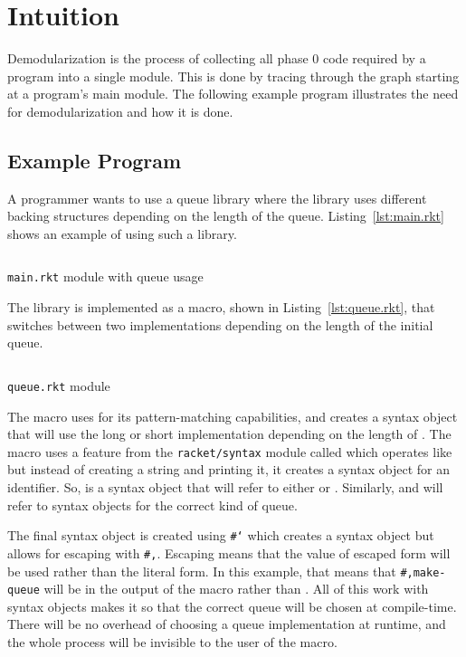 \chapter{Intuition}
\label{chap:intuition}
Demodularization is the process of collecting all phase 0 code required by a program into a single module.
This is done by tracing through the  graph starting at a program's main module.
The following example program illustrates the need for demodularization and how it is done.

\section{Example Program}
A programmer wants to use a queue library where the library uses different backing structures depending on the length of the queue. 
Listing~\ref{lst:main.rkt} shows an example of using such a library.
\begin{listing}[tb]
  \inputminted{racket}{listings/main.rkt}
  \caption{\texttt{main.rkt} module with queue usage}
  \label{lst:main.rkt}
\end{listing}
The library is implemented as a macro, shown in Listing~\ref{lst:queue.rkt}, that switches between two implementations depending on the length of the initial queue.

\begin{listing}[tb]
  \inputminted{racket}{listings/queue.rkt}
  \caption{\texttt{queue.rkt} module}
  \label{lst:queue.rkt}
\end{listing}

The macro  uses  for its pattern-matching capabilities, and creates a syntax object that will use the long or short implementation depending on the length of . 
The macro uses a feature from the \texttt{racket/syntax} module called  which operates like  but instead of creating a string and printing it, it creates a syntax object for an identifier. 
So,  is a syntax object that will refer to either  or .
Similarly,  and  will refer to syntax objects for the correct kind of queue.

The final syntax object is created using \texttt{#`} which creates a syntax object but allows for escaping with \texttt{#,}. 
Escaping means that the value of escaped form will be used rather than the literal form. 
In this example, that means that \texttt{#,make-queue} will be  in the output of the macro rather than .
All of this work with syntax objects makes it so that the correct queue will be chosen at compile-time.
There will be no overhead of choosing a queue implementation at runtime, and the whole process will be invisible to the user of the  macro.


